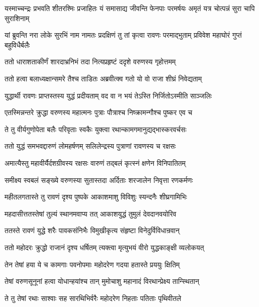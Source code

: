 \threelineshloka
{यस्माच्चन्द्रः प्रभवति शीतरश्मिः प्रजाहितः}
{यं समासाद्य जीवन्ति फेनपाः परमर्षयः}
{अमृतं यत्र चोत्पन्नं सुरा चापि सुराशिनाम्} %

\threelineshloka
{यां ब्रुवन्ति नरा लोके सुरभिं नाम नामतः}
{प्रदक्षिणं तु तां कृत्वा रावणः परमाद्भुताम्}
{प्रविवेश महाघोरं गुप्तं बहुविधैर्बलैः} %

\twolineshloka
{ततो धाराशताकीर्णं शारदाभ्रनिभं तदा}
{नित्यप्रहृष्टं ददृशे वरुणस्य गृहोत्तमम्} %

\twolineshloka
{ततो हत्वा बलाध्यक्षान्समरे तैश्च ताडितः}
{अब्रवीत्क्व गतो यो वो राजा शीघ्रं निवेद्यताम्} %

\twolineshloka
{युद्धार्थी रावणः प्राप्तस्तस्य युद्धं प्रदीयताम्}
{वद वा न भयं तेऽस्ति निर्जितोऽस्मीति साञ्जलिः} %

\twolineshloka
{एतस्मिन्नन्तरे क्रुद्धा वरुणस्य महात्मनः}
{पुत्राः पौत्राश्च निष्क्रामन्गौश्च पुष्कर एव च} %

\twolineshloka
{ते तु वीर्यगुणोपेता बलैः परिवृताः स्वकैः}
{युक्त्वा रथान्कामगमानुद्यद्भास्करवर्चसः} %

\twolineshloka
{ततो युद्धं समभवद्दारुणं लोमहर्षणम्}
{सलिलेन्द्रस्य पुत्राणां रावणस्य च रक्षसः} %

\twolineshloka
{अमात्यैस्तु महावीर्यैर्दशग्रीवस्य रक्षसः}
{वारुणं तद्बलं कृत्स्नं क्षणेन विनिपातितम्} %

\twolineshloka
{समीक्ष्य स्वबलं सङ्ख्ये वरुणस्या सुतास्तदा}
{अर्दिताः शरजालेन निवृत्ता रणकर्मणः} %

\twolineshloka
{महीतलगतास्ते तु रावणं दृश्य पुष्पके}
{आकाशमाशु विविशुः स्यन्दनैः शीघ्रगामिभिः} %

\twolineshloka
{महदासीत्ततस्तेषां तुल्यं स्थानमवाप्य तत्}
{आकाशयुद्धं तुमुलं देवदानवयोरिव} %

\twolineshloka
{ततस्ते रावणं युद्धे शरैः पावकसंनिभैः}
{विमुखीकृत्य संहृष्टा विनेदुर्विविधान्रवान्} %

\twolineshloka
{ततो महोदरः क्रुद्धो राजानं दृश्य धर्षितम्}
{त्यक्त्वा मृत्युभयं वीरो युद्धकाङ्क्षी व्यलोकयत्} %

\twolineshloka
{तेन तेषां हया ये च कामगाः पवनोपमाः}
{महोदरेण गदया हतास्ते प्रययुः क्षितिम्} %

\twolineshloka
{तेषां वरुणसूनूनां हत्वा योधान्हयांश्च तान्}
{मुमोचाशु महानादं विरथान्प्रेक्ष्य तान्स्थितान्} %

\twolineshloka
{ते तु तेषां रथाः साश्वाः सह सारथिभिर्वरैः}
{महोदरेण निहताः पतिताः पृथिवीतले} %

